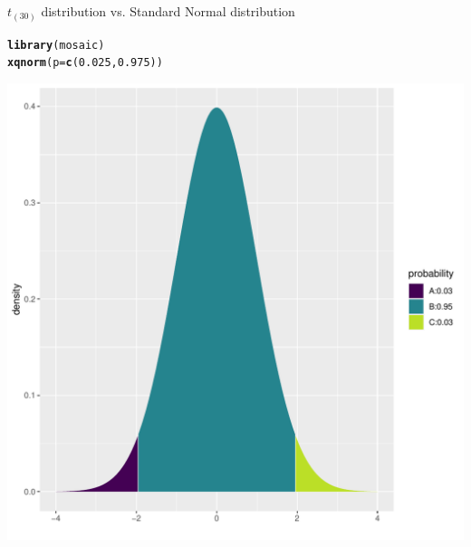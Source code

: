 \documentclass[10pt,handout]{beamer}\usepackage[]{graphicx}\usepackage[]{color}
\makeatletter
\def\maxwidth{ %
  \ifdim\Gin@nat@width>\linewidth
    \linewidth
  \else
    \Gin@nat@width
  \fi
}
\newcommand{\hlnum}[1]{\textcolor[rgb]{0.686,0.059,0.569}{#1}}%
\newcommand{\hlstd}[1]{\textcolor[rgb]{0.345,0.345,0.345}{#1}}%
\newcommand{\hlkwc}[1]{\textcolor[rgb]{0.333,0.667,0.333}{#1}}%
\newcommand{\hlkwd}[1]{\textcolor[rgb]{0.737,0.353,0.396}{\textbf{#1}}}%
\newenvironment{kframe}{%
 \def\at@end@of@kframe{}%
 \ifinner\ifhmode%
  \def\at@end@of@kframe{\end{minipage}}%
  \begin{minipage}{\columnwidth}%
 \fi\fi%
 \def\FrameCommand##1{\hskip\@totalleftmargin \hskip-\fboxsep
 \colorbox{shadecolor}{##1}\hskip-\fboxsep
     \hskip-\linewidth \hskip-\@totalleftmargin \hskip\columnwidth}%
 \MakeFramed {\advance\hsize-\width
   \@totalleftmargin\z@ \linewidth\hsize
   \@setminipage}}%
 {\par\unskip\endMakeFramed%
 \at@end@of@kframe}
\newenvironment{knitrout}{}{} %
\makeatother
\begin{document}
\begin{frame}[fragile]{$t_{(30)}$ distribution vs. Standard Normal distribution}
	\begin{minipage}{0.47\textwidth}
\begin{knitrout}\tiny
{}\color{fgcolor}\begin{kframe}
\begin{alltt}
\hlkwd{library}\hlstd{(mosaic)}
\hlkwd{xqnorm}\hlstd{(}\hlkwc{p} \hlstd{=} \hlkwd{c}\hlstd{(}\hlnum{0.025}\hlstd{,} \hlnum{0.975}\hlstd{))}
\end{alltt}
\end{kframe}
\end{knitrout}
\begin{knitrout}\tiny
{}\color{fgcolor}

{\centering \includegraphics[width=\maxwidth]{figure/unnamed-chunk-5-1} 

}



\end{knitrout}
\end{minipage}
\end{frame}
\end{document}
